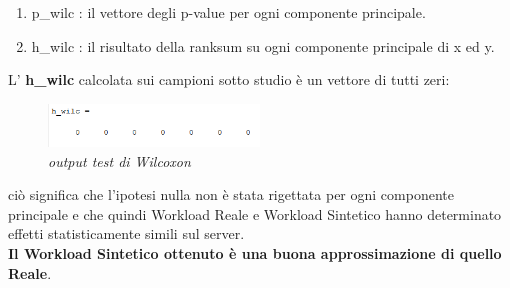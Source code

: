 \begin{enumerate}
	\item p\_wilc : il vettore degli p-value per ogni componente principale.
	\item h\_wilc : il risultato della ranksum su ogni componente principale di x ed y. 
\end{enumerate}
L' \textbf{h\_wilc} calcolata sui campioni sotto studio è un vettore di tutti zeri:
\begin{figure}[H]
	\centering
	\includegraphics[width=0.5\textwidth]{img/hw3/h_wilc.png}
	\caption{\textit{output test di Wilcoxon}}
\end{figure}
ciò significa che l'ipotesi nulla non è stata rigettata per ogni componente principale e che quindi Workload Reale e Workload Sintetico hanno determinato effetti statisticamente simili sul server.
\\
\textbf{Il Workload Sintetico ottenuto è una buona approssimazione di quello Reale}.
